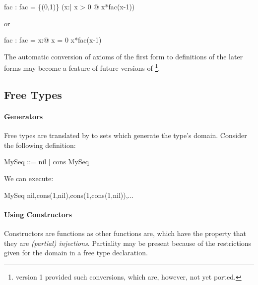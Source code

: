 \documentclass{article}
\begin{document}

\begin{axdef}
  fac : \nat \fun \nat
\where
  fac = \{(0,1)\} \cup (\lambda x:\nat | x > 0 @ x*fac(x-1))
\end{axdef}

or


\begin{axdef}
  fac : \nat \fun \nat
\where
  fac = \lambda x:\nat @ \IF x = 0  \ELSE x*fac(x-1)
\end{axdef}

The automatic conversion of axioms of the first form
to definitions of the later forms may become a feature of future
versions of \ZAP\footnote{\ZAP{} version 1 provided such
conversions, which are, however, not yet ported.}.

\subsection{Free Types}
\label{sec:freetypes}

\paragraph{Generators}

Free types are translated by \ZAP{} to sets which generate the type's
domain.  Consider the following definition:

\begin{zedgroup}
\begin{zdirectives}
\end{zdirectives}
\begin{zed}
  MySeq ::= nil | cons   \cross MySeq \rdata
\end{zed}
\end{zedgroup}

We can execute:

\begin{zexecexpr}
  MySeq
\yields
{nil,cons(1,nil),cons(1,cons(1,nil)),...}
\end{zexecexpr}


\paragraph{Using Constructors}

Constructors are functions as other functions are, which have
the property that they are \emph{(partial) injections}. Partiality
may be present because of the restrictions given for the domain 
in a free type declaration. 
\end{document}
